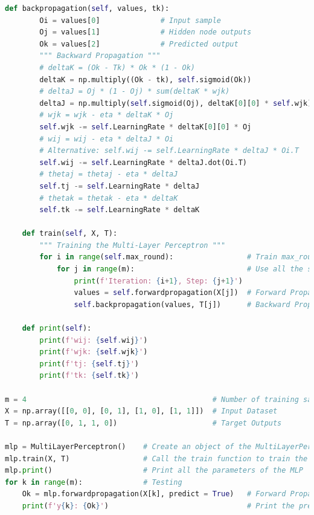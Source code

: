 \documentclass{book}
\begin{document}
\begin{lstlisting}[language=Python, basicstyle=\ttfamily\small, keywordstyle=\color{blue}, commentstyle=\color{forestgreen}, stringstyle=\color{red}, showstringspaces=false]
    def backpropagation(self, values, tk):
        Oi = values[0]              # Input sample
        Oj = values[1]              # Hidden node outputs
        Ok = values[2]              # Predicted output
        """ Backward Propagation """
        # deltaK = (Ok - Tk) * Ok * (1 - Ok)
        deltaK = np.multiply((Ok - tk), self.sigmoid(Ok))               # Shape (1, 1)
        # deltaJ = Oj * (1 - Oj) * sum(deltaK * wjk)
        deltaJ = np.multiply(self.sigmoid(Oj), deltaK[0][0] * self.wjk) # Shape (2, 1)
        # wjk = wjk - eta * deltaK * Oj
        self.wjk -= self.LearningRate * deltaK[0][0] * Oj               # Shape (2, 1)    
        # wij = wij - eta * deltaJ * Oi
        # Alternative: self.wij -= self.LearningRate * deltaJ * Oi.T
        self.wij -= self.LearningRate * deltaJ.dot(Oi.T)                # Shape (2, 2)
        # thetaj = thetaj - eta * deltaJ
        self.tj -= self.LearningRate * deltaJ                           # Shape (2, 1)
        # thetak = thetak - eta * deltaK
        self.tk -= self.LearningRate * deltaK                           # Shape (1, 1)

    def train(self, X, T):
        """ Training the Multi-Layer Perceptron """
        for i in range(self.max_round):                 # Train max_round number of rounds
            for j in range(m):                          # Use all the samples in the dataset
                print(f'Iteration: {i+1}, Step: {j+1}')
                values = self.forwardpropagation(X[j])  # Forward Propagation
                self.backpropagation(values, T[j])      # Backward Propagation
    
    def print(self):
        print(f'wij: {self.wij}')
        print(f'wjk: {self.wjk}')
        print(f'tj: {self.tj}')
        print(f'tk: {self.tk}')

m = 4                                           # Number of training samples
X = np.array([[0, 0], [0, 1], [1, 0], [1, 1]])  # Input Dataset
T = np.array([0, 1, 1, 0])                      # Target Outputs

mlp = MultiLayerPerceptron()    # Create an object of the MultiLayerPerceptron class
mlp.train(X, T)                 # Call the train function to train the MLP
mlp.print()                     # Print all the parameters of the MLP
for k in range(m):              # Testing
    Ok = mlp.forwardpropagation(X[k], predict = True)   # Forward Propagation
    print(f'y{k}: {Ok}')                                # Print the predicted output




\end{lstlisting}
\end{document}

